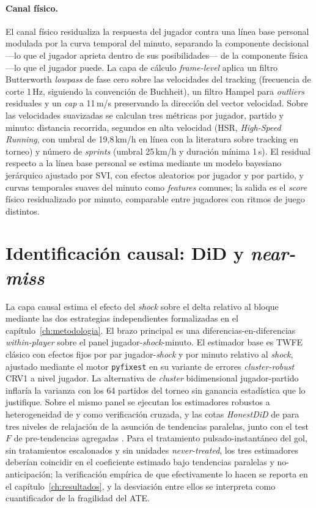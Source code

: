 \paragraph{Canal físico.}
El canal físico residualiza la respuesta del jugador contra una línea
base personal modulada por la curva temporal del minuto, separando
la componente decisional ---lo que el jugador aprieta dentro de sus
posibilidades--- de la componente física ---lo que el jugador puede.
La capa de cálculo \textit{frame-level} aplica un filtro Butterworth
\textit{lowpass} de fase cero sobre las velocidades del tracking
(frecuencia de corte 1\,Hz, siguiendo la convención de Buchheit), un
filtro Hampel para \textit{outliers} residuales y un \textit{cap} a
11\,m/s preservando la dirección del vector velocidad. Sobre las
velocidades suavizadas se calculan tres métricas por jugador, partido
y minuto: distancia recorrida, segundos en alta velocidad (HSR,
\textit{High-Speed Running}, con umbral de 19{,}8\,km/h en línea
con la literatura sobre tracking en torneo) y número de
\textit{sprints} (umbral 25\,km/h y duración mínima 1\,s). El
residual respecto a la línea base personal se estima mediante un
modelo bayesiano jerárquico ajustado por SVI, con efectos aleatorios
por jugador y por partido, y curvas temporales suaves del minuto
como \textit{features} comunes; la salida es el \textit{score}
físico residualizado por minuto, comparable entre jugadores con
ritmos de juego distintos.


\section{Identificación causal: DiD y \textit{near-miss}}
\label{sec:causal}

La capa causal estima el efecto del \textit{shock} sobre el delta
relativo al bloque mediante las dos estrategias independientes
formalizadas en el capítulo~\ref{ch:metodologia}. El brazo principal
es una diferencias-en-diferencias \textit{within-player} sobre el
panel jugador-\textit{shock}-minuto. El estimador base es TWFE
clásico con efectos fijos por par jugador-\textit{shock} y por minuto
relativo al \textit{shock}, ajustado mediante el motor
\texttt{pyfixest} en su variante de errores
\textit{cluster-robust} CRV1 a nivel jugador. La alternativa de
\textit{cluster} bidimensional jugador-partido inflaría la varianza
con los 64 partidos del torneo sin ganancia estadística que lo
justifique. Sobre el mismo panel se ejecutan los
estimadores robustos a heterogeneidad de \textcite{SunAbraham2021} y
\textcite{BorusyakJaravelSpiess2024} como verificación cruzada, y las
cotas \textit{HonestDiD} de \textcite{RambachanRoth2023} para tres
niveles de relajación de la asunción de tendencias paralelas, junto
con el test $F$ de pre-tendencias agregadas \parencite{Roth2022Pretest}.
Para el tratamiento pulsado-instantáneo del gol, sin tratamientos
escalonados y sin unidades \textit{never-treated}, los tres
estimadores deberían coincidir en el coeficiente estimado bajo
tendencias paralelas y no-anticipación; la verificación empírica
de que efectivamente lo hacen se reporta en el
capítulo~\ref{ch:resultados}, y la desviación entre ellos se interpreta
como cuantificador de la fragilidad del ATE.

